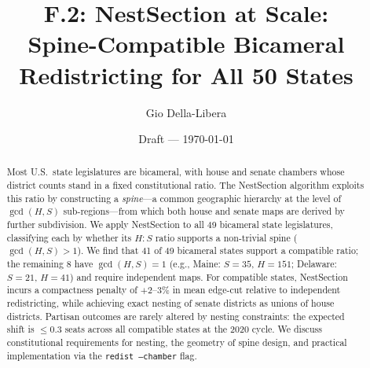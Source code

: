\documentclass[12pt]{article}
\title{F.2: NestSection at Scale:\\
       Spine-Compatible Bicameral Redistricting for All 50 States}
\author{Gio Della-Libera}
\date{Draft --- \today}
\begin{document}
\maketitle

\begin{abstract}
Most U.S.\ state legislatures are bicameral, with house and senate chambers
whose district counts stand in a fixed constitutional ratio. The NestSection
algorithm \citep{dellaLibera2026nestSection} exploits this ratio by constructing
a \emph{spine}---a common geographic hierarchy at the level of
$\gcd(H,S)$ sub-regions---from which both house and senate maps are derived
by further subdivision. We apply NestSection to all 49 bicameral state
legislatures, classifying each by whether its $H:S$ ratio supports a
non-trivial spine ($\gcd(H,S) > 1$). We find that 41 of 49 bicameral states support a compatible ratio; the remaining 8 have
$\gcd(H,S) = 1$ (e.g., Maine: $S=35$, $H=151$; Delaware: $S=21$, $H=41$) and require independent
maps. For compatible states, NestSection incurs a compactness penalty of
$+2$--$3\%$ in mean edge-cut relative to independent redistricting, while
achieving exact nesting of senate districts as unions of house districts.
Partisan outcomes are rarely altered by nesting constraints: the expected
shift is $\leq 0.3$ seats across all compatible states at the 2020 cycle.
We discuss constitutional requirements for nesting, the geometry of spine
design, and practical implementation via the \texttt{redist --chamber}
flag.
\end{abstract}











\end{document}
